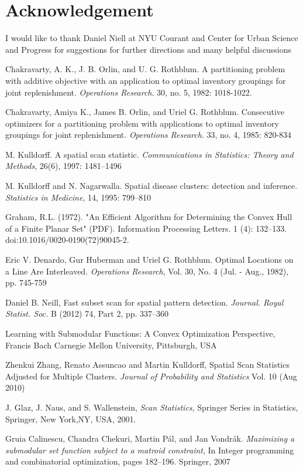 \documentclass{article}
\theoremstyle{case}
\begin{document}
\section*{Acknowledgement}
I would like to thank Daniel Niell at NYU Courant and Center for Urban Science and Progress for suggestions for further directions and many helpful discussions
\begin{thebibliography}{1}

    Chakravarty, A. K., J. B. Orlin, and U. G. Rothblum. A partitioning problem with additive objective with an application to optimal inventory groupings for joint replenishment. {\em Operations Research}. 30, no. 5, 1982: 1018-1022.

     Chakravarty, Amiya K., James B. Orlin, and Uriel G. Rothblum. Consecutive optimizers for a partitioning problem with applications to optimal inventory groupings for joint replenishment. {\em Operations Research}. 33, no. 4, 1985: 820-834

	 M. Kulldorff. A spatial scan statistic. {\em Communications in Statistics: Theory and Methods}, 26(6), 1997: 1481–1496

	 M. Kulldorff and N. Nagarwalla. Spatial disease clusters: detection and inference. {\em Statistics in Medicine}, 14, 1995: 799–810
	
	 Graham, R.L. (1972). "An Efficient Algorithm for Determining the Convex Hull of a Finite Planar Set" (PDF). Information Processing Letters. 1 (4): 132–133. doi:10.1016/0020-0190(72)90045-2.	
	
	 Eric V. Denardo, Gur Huberman and Uriel G. Rothblum. Optimal Locations on a Line Are Interleaved. {\em Operations Research}, Vol. 30, No. 4 (Jul. - Aug., 1982), pp. 745-759

	 Daniel B. Neill, Fast subset scan for spatial pattern detection. {\em Journal. Royal Statist. Soc.} B (2012) 74, Part 2, pp. 337–360
	
	 Learning with Submodular Functions: A Convex Optimization Perspective, Francis Bach Carnegie Mellon University, Pittsburgh, USA
	
	 Zhenkui Zhang, Renato Assuncao and Martin Kulldorff, Spatial Scan Statistics Adjusted for Multiple Clusters. {\em Journal of Probability and Statistics} Vol. 10 (Aug 2010)
	
	 J. Glaz, J. Naus, and S. Wallenstein, {\em Scan Statistics}, Springer Series in Statistics, Springer, New York,NY, USA, 2001.
	
	 Gruia Calinescu, Chandra Chekuri, Martin Pál, and Jan Vondrák. {\em Maximizing a submodular set function subject to a matroid constraint}, In Integer programming and combinatorial optimization, pages 182–196. Springer, 2007

\end{thebibliography}
\end{document}
